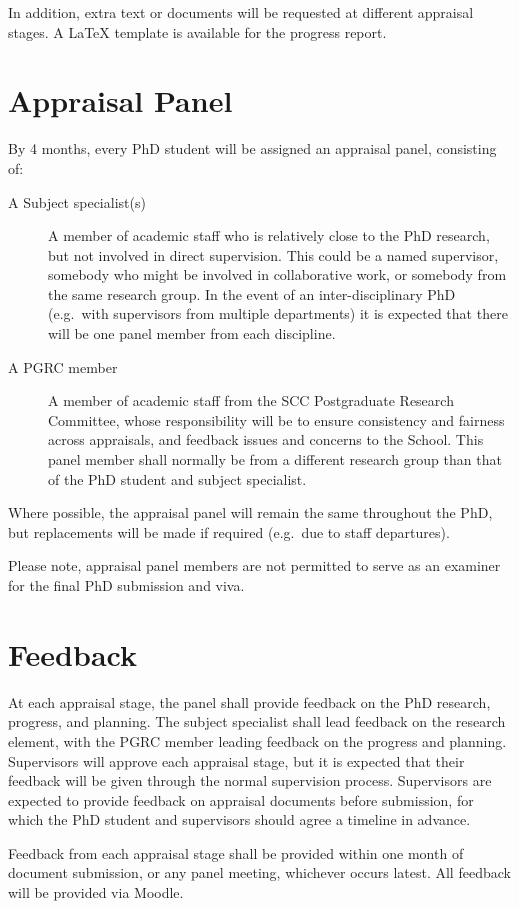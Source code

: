 \documentclass[12pt,a4paper]{article}
\begin{document}
In addition, extra text or documents will be requested at different appraisal stages. A \LaTeX{} template is available for the progress report.

\section{Appraisal Panel}
By 4 months, every PhD student will be assigned an appraisal panel, consisting of:
\begin{description}
	\item[A Subject specialist(s)] A member of academic staff who is relatively close to the PhD research, but not involved in direct supervision. This could be a named supervisor, somebody who might be involved in collaborative work, or somebody from the same research group. In the event of an inter-disciplinary PhD (e.g.\ with supervisors from multiple departments) it is expected that there will be one panel member from each discipline.
	\item[A PGRC member] A member of academic staff from the SCC Postgraduate Research Committee, whose responsibility will be to ensure consistency and fairness across appraisals, and feedback issues and concerns to the School. This panel member shall normally be from a different research group than that of the PhD student and subject specialist.
\end{description}

Where possible, the appraisal panel will remain the same throughout the PhD, but replacements will be made if required (e.g.\ due to staff departures).

Please note, appraisal panel members are not permitted to serve as an examiner for the final PhD submission and viva.


\section{Feedback}
At each appraisal stage, the panel shall provide feedback on the PhD research, progress, and planning. The subject specialist shall lead feedback on the research element, with the PGRC member leading feedback on the progress and planning. Supervisors will approve each appraisal stage, but it is expected that their feedback will be given through the normal supervision process. Supervisors are expected to provide feedback on appraisal documents before submission, for which the PhD student and supervisors should agree a timeline in advance.

Feedback from each appraisal stage shall be provided within one month of document submission, or any panel meeting, whichever occurs latest. All feedback will be provided via Moodle.
\end{document}
